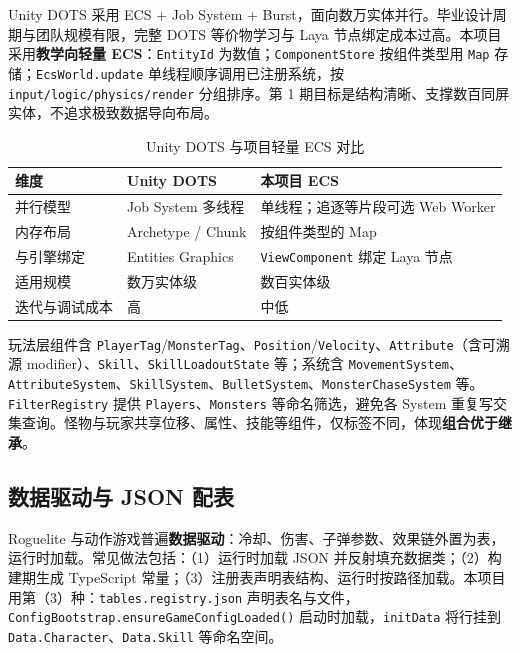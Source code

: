 \documentclass[UTF8,a4paper]{ctexart}
\begin{document}
Unity DOTS 采用 ECS + Job System + Burst，面向数万实体并行\cite{gregory2018game}。毕业设计周期与团队规模有限，完整 DOTS 等价物学习与 Laya 节点绑定成本过高。本项目采用\textbf{教学向轻量 ECS}：\texttt{EntityId} 为数值；\texttt{ComponentStore} 按组件类型用 \texttt{Map} 存储；\texttt{EcsWorld.update} 单线程顺序调用已注册系统，按 \texttt{input/logic/physics/render} 分组排序。第 1 期目标是结构清晰、支撑数百同屏实体，不追求极致数据导向布局。

\begin{table}[htbp]
  
  \caption{Unity DOTS 与项目轻量 ECS 对比}
  \label{tab:dots-compare}
  \begin{tabular}{p{3.2cm}p{4.5cm}p{4.5cm}}
    \toprule
    \textbf{维度} & \textbf{Unity DOTS} & \textbf{本项目 ECS} \\
    \midrule
    并行模型 & Job System 多线程 & 单线程；追逐等片段可选 Web Worker \\
    内存布局 & Archetype / Chunk & 按组件类型的 Map \\
    与引擎绑定 & Entities Graphics & \texttt{ViewComponent} 绑定 Laya 节点 \\
    适用规模 & 数万实体级 & 数百实体级 \\
    迭代与调试成本 & 高 & 中低 \\
    \bottomrule
  \end{tabular}
\end{table}

玩法层组件含 \texttt{PlayerTag}/\texttt{MonsterTag}、\texttt{Position}/\texttt{Velocity}、\texttt{Attribute}（含可溯源 modifier）、\texttt{Skill}、\texttt{SkillLoadoutState} 等；系统含 \texttt{MovementSystem}、\texttt{AttributeSystem}、\texttt{SkillSystem}、\texttt{BulletSystem}、\texttt{MonsterChaseSystem} 等。\texttt{FilterRegistry} 提供 \texttt{Players}、\texttt{Monsters} 等命名筛选，避免各 System 重复写交集查询。怪物与玩家共享位移、属性、技能等组件，仅标签不同，体现\textbf{组合优于继承}。

\subsection{数据驱动与 JSON 配表}

Roguelite 与动作游戏普遍\textbf{数据驱动}：冷却、伤害、子弹参数、效果链外置为表，运行时加载\cite{gregory2018game}。常见做法包括：（1）运行时加载 JSON 并反射填充数据类；（2）构建期生成 TypeScript 常量；（3）注册表声明表结构、运行时按路径加载。本项目用第（3）种：\texttt{tables.registry.json} 声明表名与文件，\texttt{ConfigBootstrap.ensureGameConfigLoaded()} 启动时加载，\texttt{initData} 将行挂到 \texttt{Data.Character}、\texttt{Data.Skill} 等命名空间。
\end{document}
